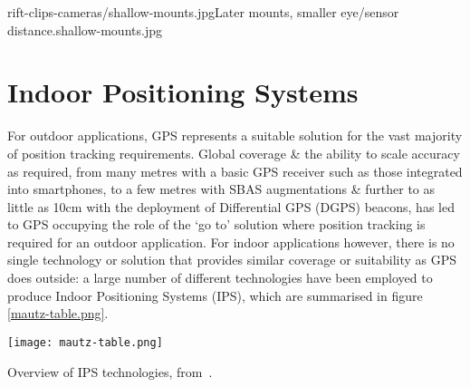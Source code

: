        {rift-clips-cameras/shallow-mounts.jpg}{Later mounts, smaller eye/sensor distance.}{shallow-mounts.jpg}






\section{Indoor Positioning Systems}

For outdoor applications, GPS represents a suitable solution for the vast majority of position tracking requirements. Global coverage \& the ability to scale accuracy as required, from many metres with a basic GPS receiver such as those integrated into smartphones, to a few metres with SBAS augmentations \& further to as little as 10cm with the deployment of Differential GPS (DGPS) beacons, has led to GPS occupying the role of the `go to' solution where position tracking is required for an outdoor application. For indoor applications however, there is no single technology or solution that provides similar coverage or suitability as GPS does outside: a large number of different technologies have been employed to produce Indoor Positioning Systems (IPS), which are summarised in figure \ref{mautz-table.png}.

\begin{table}
	\begin{center}
		\texttt{[image: mautz-table.png]}
	\end{center}
	\caption{Overview of IPS technologies, from~\cite{Mautz2012}.}
	\label{mautz-table.png}
\end{table}

